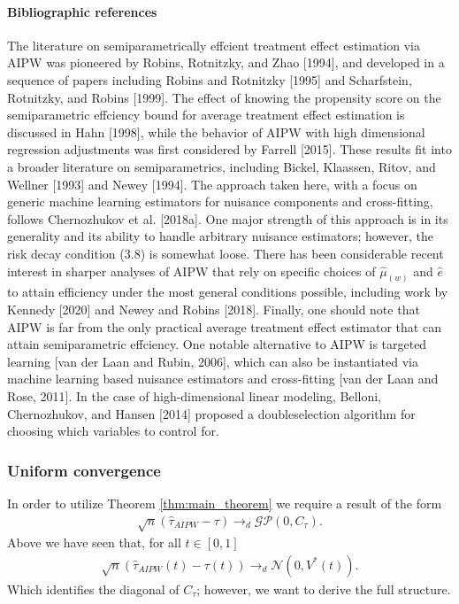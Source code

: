 \paragraph{Bibliographic references}

The literature on semiparametrically effcient treatment effect estimation via AIPW was
pioneered by Robins, Rotnitzky, and Zhao [1994], and developed in a sequence of papers
including Robins and Rotnitzky [1995] and Scharfstein, Rotnitzky, and Robins [1999]. The
effect of knowing the propensity score on the semiparametric effciency bound for average
treatment effect estimation is discussed in Hahn [1998], while the behavior of AIPW with
high dimensional regression adjustments was first considered by Farrell [2015]. These
results fit into a broader literature on semiparametrics, including Bickel, Klaassen,
Ritov, and Wellner [1993] and Newey [1994]. The approach taken here, with a focus on
generic machine learning estimators for nuisance components and cross-fitting, follows
Chernozhukov et al. [2018a]. One major strength of this approach is in its generality
and its ability to handle arbitrary nuisance estimators; however, the risk decay
condition (3.8) is somewhat loose. There has been considerable recent interest in
sharper analyses of AIPW that rely on specific choices of $\hat{\mu}_{(w)}$ and
$\hat{e}$ to attain efficiency under the most general conditions possible, including
work by Kennedy [2020] and Newey and Robins [2018]. Finally, one should note that AIPW
is far from the only practical average treatment effect estimator that can attain
semiparametric effciency. One notable alternative to AIPW is targeted learning [van der
Laan and Rubin, 2006], which can also be instantiated via machine learning based
nuisance estimators and cross-fitting [van der Laan and Rose, 2011]. In the case of
high-dimensional linear modeling, Belloni, Chernozhukov, and Hansen [2014] proposed a
doubleselection algorithm for choosing which variables to control for.


\subsubsection{Uniform convergence}

In order to utilize Theorem \ref{thm:main_theorem} we require a result of the form
\begin{align}
    \sqrt{n} (\hat{\tau}_{AIPW} - \tau) \to_d \mathcal{GP}(0, C_\tau).
\end{align}
Above we have seen that, for all $t \in [0, 1]$
\begin{align}
    \sqrt{n} (\hat{\tau}_{AIPW}(t) - \tau(t)) \to_d \mathcal{N}(0, V^\ast(t)).
\end{align}
Which identifies the diagonal of $C_\tau$; however, we want to derive the full
structure.


